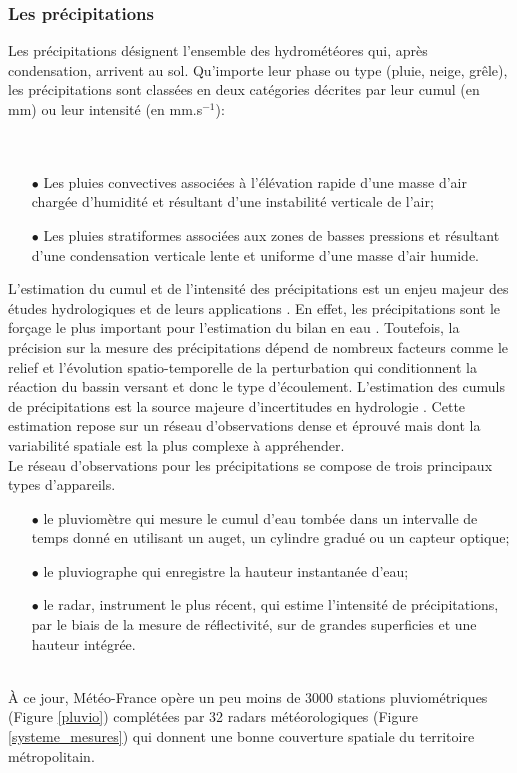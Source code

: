 \subsubsection{{\selectfont Les précipitations}}

Les précipitations désignent l’ensemble des hydrométéores qui, après condensation, arrivent au sol. Qu’importe leur phase ou type (pluie, neige, grêle), les précipitations sont classées en deux catégories décrites par leur cumul (en mm) ou leur intensité (en mm.s$^{-1}$):\\
~\\
~\\
\begin{itemize}
			\item[$\bullet$] Les pluies convectives associées à l’élévation rapide d’une masse d’air chargée d’humidité et résultant d’une instabilité verticale de l’air;
			\item[$\bullet$] Les pluies stratiformes associées aux zones de basses pressions et résultant d’une condensation verticale lente et uniforme d’une masse d’air humide.
\end{itemize}

\noindent L’estimation du cumul et de l’intensité des précipitations est un enjeu majeur des études hydrologiques et de leurs applications \citep{winter1995}. En effet, les précipitations sont le forçage le plus important pour l’estimation du bilan en eau \citep{yilmaz2005,stisen2012}. Toutefois, la précision sur la mesure des précipitations dépend de nombreux facteurs comme le relief et l'évolution spatio-temporelle de la perturbation qui conditionnent la réaction du bassin versant et donc le type d'écoulement. L'estimation des cumuls de précipitations est la source majeure d'incertitudes en hydrologie \citep{fekete2004}. Cette estimation repose sur un réseau d'observations dense et éprouvé mais dont la variabilité spatiale est la plus complexe à appréhender. \\

Le réseau d'observations pour les précipitations se compose de trois principaux types d'appareils. \\

\begin{itemize}
\item[$\bullet$] le pluviomètre qui mesure le cumul d'eau tombée dans un intervalle de temps donné en utilisant un auget, un cylindre gradué ou un capteur optique; 
\item[$\bullet$] le pluviographe qui enregistre la hauteur instantanée d'eau;
\item[$\bullet$] le radar, instrument le plus récent, qui estime l'intensité de précipitations, par le biais de la mesure de réflectivité, sur de grandes superficies et une hauteur intégrée.
\end{itemize}
~\\
À ce jour, Météo-France opère un peu moins de 3000 stations pluviométriques (Figure \ref{pluvio}) complétées par 32 radars météorologiques (Figure \ref{systeme_mesures}) qui donnent une bonne couverture spatiale du territoire métropolitain. \\

